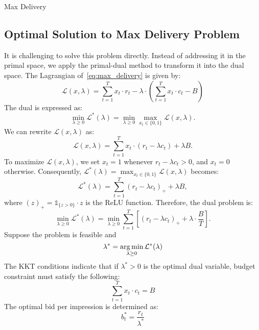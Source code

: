 \documentclass[../main.tex]{subfiles}
\begin{document}
\begin{section}{Max Delivery}
	
	

	
	\subsection* {Optimal Solution to Max Delivery Problem}
		
		It is challenging to solve this problem directly. Instead of addressing it in the primal space, we apply the primal-dual method to transform it into the dual space. The Lagrangian of~\eqref{eq:max_delivery} is given by:
		\begin{equation*}
			\mathcal{L}(x, \lambda) = \sum_{t=1}^T x_t \cdot r_t  - \lambda \cdot \left( \sum_{t=1}^{T} x_t \cdot c_t  - B  \right)
		\end{equation*}
		The dual  is expressed as:
		\begin{equation*}
			\min_{\lambda \geq 0} \mathcal{L}^*(\lambda) = \min_{\lambda \geq 0} \max_{x_t \in \{0,1\}} \mathcal{L}(x, \lambda).
		\end{equation*}
		We can rewrite \(\mathcal{L}(x, \lambda)\) as:
		\begin{equation*}
			\mathcal{L}(x, \lambda) = \sum_{t=1}^T  x_t \cdot (r_t - \lambda c_t)  + \lambda B.
		\end{equation*}
		To maximize \(\mathcal{L}(x, \lambda)\), we set \(x_t = 1\) whenever \(r_t - \lambda c_t > 0\), and \(x_t = 0\) otherwise. Consequently, \(\mathcal{L}^*(\lambda) = \max_{x_t \in \{0,1\}} \mathcal{L}(x, \lambda)\) becomes:
		\begin{equation*}
			\mathcal{L}^*(\lambda) = \sum_{t=1}^{T} (r_t - \lambda c_t)_{+}  + \lambda B,
		\end{equation*}
		where \((z)_{+} = \mathds{1}_{ \{z>0\}} \cdot z\) is the ReLU function. Therefore, the dual problem is:
		\begin{equation} \label{eq:max_delivery_dual}
			\min_{\lambda \geq 0}  \mathcal{L}^*(\lambda) = \min_{\lambda \geq 0}  \sum_{t=1}^{T} \left[ (r_t - \lambda c_t)_{+} + \lambda \cdot \frac{B}{T} \right].
		\end{equation}
	Suppose the problem is feasible and 
	\[
	\lambda^* = \operatorname*{arg\,min}_{\lambda \geq 0} \mathcal{L}^*(\lambda)
	\]
	The KKT conditions indicate that if $\lambda^* > 0$ is the optimal dual variable, budget constraint must satisfy the following:
	\[
	\sum_{t=1}^{T} x_t \cdot c_t = B
	\]
	The optimal bid per impression is determined as: 
	\begin{equation*}
		b_t^* = \frac{r_t}{ \lambda^*}
	\end{equation*}

\end{section}
\end{document}
